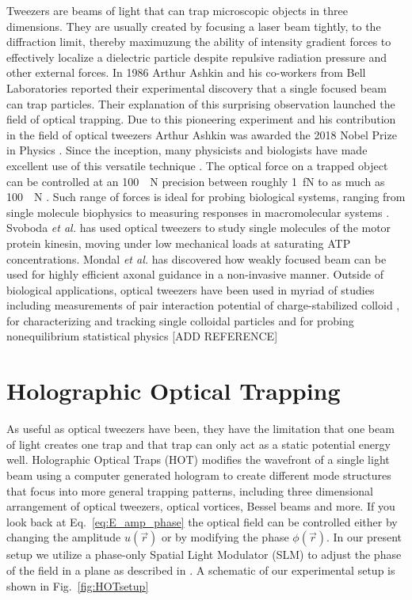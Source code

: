 Tweezers are beams of light that can trap microscopic objects in three dimensions. They are usually created by focusing a laser beam tightly, to the diffraction limit, thereby maximuzung the ability of intensity gradient forces to effectively localize a dielectric particle despite repulsive radiation pressure and other external forces. In 1986 Arthur Ashkin and his co-workers \cite{Ashkin:86} from Bell Laboratories reported their experimental discovery that a single focused beam can trap particles. Their explanation of this surprising observation launched the field of optical trapping. Due to this pioneering experiment and his contribution in the field of optical tweezers Arthur Ashkin was awarded the 2018 Nobel Prize in Physics \cite{nobel_media_2019}. Since the inception, many physicists and biologists have made excellent use of this versatile technique \cite{grier2003nature}. The optical force on a trapped object can be controlled at an \SI{100}{\newton} precision between roughly \SI{1}{\femto \newton} to as much as \SI{100}{\newton} \cite{Rohrbach:02}. Such range of forces is ideal for probing biological systems, ranging from single molecule biophysics to measuring responses in macromolecular systems \cite{Svoboda1994,Litvinov7426,Brouhard2003}. Svoboda \emph{et al.}  \cite{Svoboda11782} has used optical tweezers to study single molecules of the motor protein kinesin, moving under low mechanical loads at saturating ATP concentrations. Mondal \emph{et al.} \cite{argha2014} has discovered how weakly focused beam can be used for highly efficient axonal guidance in a non-invasive manner. Outside of biological applications, optical tweezers have been used in myriad of studies including measurements of pair interaction potential of charge-stabilized colloid \cite{crocker1994}, for characterizing and tracking single colloidal particles \cite{Lee07colloid, Cheong2009, xiao2010, chen2015, chen2016} and for probing nonequilibrium statistical physics [ADD REFERENCE]


\section{Holographic Optical Trapping}
\label{sec:HOT}

As useful as optical tweezers have been, they have the limitation that one beam of light creates one trap and that trap can only act as a static potential energy well. Holographic Optical Traps (HOT) modifies the wavefront of a single light beam using a computer generated hologram to create different mode structures that focus into more general trapping patterns, including three dimensional arrangement of optical tweezers, optical vortices, Bessel beams and more. If you look back at Eq.~\eqref{eq:E_amp_phase} the optical field can be controlled either by changing the amplitude $u(\vec{r})$ or by modifying the phase $\phi (\vec{r})$. In our present setup we utilize a phase-only Spatial Light Modulator (SLM) \cite{Igasaki1999} to adjust the phase of the field in a plane as described in \cite{he1995, dufrense2001hot, CURTIS2002169, Grier:06, Polin:05}. A schematic of our experimental setup is shown in Fig.~\ref{fig:HOTsetup}


